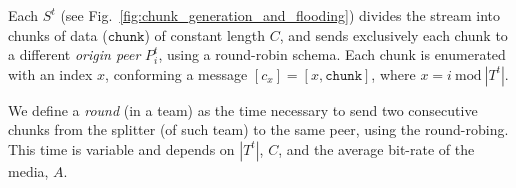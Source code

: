 \label{sec:chunk_generation}
\begin{figure*}
  \caption{Chunk generation at the splitter $S^t$, and chunk flooding
    at peers $P^t_k$.\label{fig:chunk_generation_and_flooding}}
\end{figure*}
Each $S^t$ (see Fig.~\ref{fig:chunk_generation_and_flooding})
divides the stream into chunks of data ($\mathtt{chunk}$) of constant
length $C$, and sends exclusively each chunk to a different
\emph{origin peer} $P^t_i$, using a round-robin schema. Each
chunk is enumerated with an index $x$, conforming a message
$[c_x]=[x,\mathtt{chunk}]$, where $x=i~\mathrm{mod}~|T^t|$.

We define a \emph{round} (in a team) as the time necessary to send two
consecutive chunks from the splitter (of such team) to the same peer,
using the round-robing. This time is variable and depends on $|T^t|$,
$C$, and the average bit-rate of the media, $A$.

\begin{comment}
The round-time is defined by:
\begin{equation}
  \cal{r} = \cal{c}N.
  \label{eq:round_time}
\end{equation}
For example, if we use only one team of $N=256$ peers, a chunk size
$C=1024$~bytes, and a video of $1$~Mb/s, the round time is
\begin{displaymath}
  \cal{r} = \frac{1024\frac{\text{bytes}}{\text{chunk}}\times
    8\frac{\text{bits}}{\text{byte}}}{10^6\frac{\text{bits}}{\text{second}}}\times
  256 \approx 2.1~\text{seconds}.
\end{displaymath}
\end{comment}
